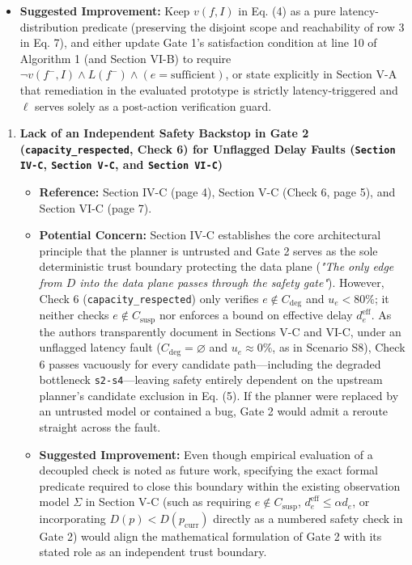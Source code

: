 \documentclass[11pt,a4paper]{article}
\begin{document}
\begin{itemize}[leftmargin=1.8em,itemsep=2pt]
\item \textbf{Suggested Improvement:} Keep $v(f, I)$ in Eq. (4) as a pure latency-distribution predicate (preserving the disjoint scope and reachability of row 3 in Eq. 7), and either update Gate 1's satisfaction condition at line 10 of Algorithm 1 (and Section VI-B) to require $\neg v(f^-, I) \land L(f^-) \land (e = \text{sufficient})$, or state explicitly in Section V-A that remediation in the evaluated prototype is strictly latency-triggered and $\ell$ serves solely as a post-action verification guard.
\end{itemize}
\begin{enumerate}[leftmargin=1.6em,itemsep=3pt]
\item \textbf{Lack of an Independent Safety Backstop in Gate 2 (\texttt{capacity\_respected}, Check 6) for Unflagged Delay Faults (\texttt{Section IV-C}, \texttt{Section V-C}, and \texttt{Section VI-C})}
\begin{itemize}[leftmargin=1.8em,itemsep=2pt]
\item \textbf{Reference:} Section IV-C (page 4), Section V-C (Check 6, page 5), and Section VI-C (page 7).
\item \textbf{Potential Concern:} Section IV-C establishes the core architectural principle that the planner is untrusted and Gate 2 serves as the sole deterministic trust boundary protecting the data plane (\emph{"The only edge from $D$ into the data plane passes through the safety gate"}). However, Check 6 (\texttt{capacity\_respected}) only verifies $e \notin C_{\text{deg}}$ and $u_e < 80\%$; it neither checks $e \notin C_{\text{susp}}$ nor enforces a bound on effective delay $d_e^{\text{eff}}$. As the authors transparently document in Sections V-C and VI-C, under an unflagged latency fault ($C_{\text{deg}} = \varnothing$ and $u_e \approx 0\%$, as in Scenario S8), Check 6 passes vacuously for every candidate path—including the degraded bottleneck \texttt{s2-s4}—leaving safety entirely dependent on the upstream planner's candidate exclusion in Eq. (5). If the planner were replaced by an untrusted model or contained a bug, Gate 2 would admit a reroute straight across the fault.
\item \textbf{Suggested Improvement:} Even though empirical evaluation of a decoupled check is noted as future work, specifying the exact formal predicate required to close this boundary within the existing observation model $\Sigma$ in Section V-C (such as requiring $e \notin C_{\text{susp}}$, $d_e^{\text{eff}} \le \alpha d_e$, or incorporating $D(p) < D(p_{\text{curr}})$ directly as a numbered safety check in Gate 2) would align the mathematical formulation of Gate 2 with its stated role as an independent trust boundary.
\end{itemize}
\end{enumerate}
\end{document}
